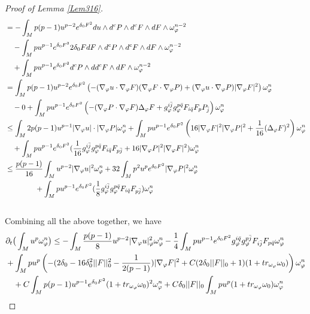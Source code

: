 \documentclass[11pt]{amsart}
\numberwithin{equation}{section}
\begin{document}
\begin{proof}[Proof of Lemma \ref{Lem316}]
\begin{align}
	&=-\int_Mp(p-1)u^{p-2}e^{\delta_0F^2}du\wedge d^cP\wedge d^cF\wedge dF\wedge \omega_{\varphi}^{n-2} \notag \\
	&\quad-\int_Mpu^{p-1}e^{\delta_0F^2}2\delta_0 F dF\wedge d^cP\wedge d^cF\wedge dF\wedge \omega_{\varphi}^{n-2} \notag \\
	&\quad +\int_M pu^{p-1}e^{\delta_0F^2}d^cP\wedge dd^cF\wedge dF\wedge \omega_{\varphi}^{n-2} \notag\\
	&= \int_Mp(p-1)u^{p-2}e^{\delta_0F^2}\left( -(\nabla_\varphi u\cdot\nabla_\varphi F)(\nabla_\varphi F\cdot\nabla_\varphi P) + (\nabla_\varphi u\cdot \nabla_\varphi P) |\nabla_\varphi F|^2 \right)  \omega_{\varphi}^{n} \notag \\
	&\quad -0+\int_M pu^{p-1}e^{\delta_0F^2}\left(-(\nabla_\varphi P\cdot \nabla_\varphi F)\Delta_\varphi F+ g_\varphi^{i\bar j}g_\varphi^{p\bar q}F_{i\bar q}F_{p}P_{\bar j} \right)  \omega_{\varphi}^{n} \notag\\
	&\le  \int_M 2p(p-1)u^{p-1}|\nabla_\varphi u|\cdot|\nabla_\varphi P| \omega_\varphi^n + \int_M pu^{p-1}e^{\delta_0F^2}\left( 16|\nabla_\varphi F|^2|\nabla_\varphi P|^2 +\frac{1}{16} (\Delta_\varphi F)^2\right) \omega_\varphi^n \notag\\
	&\quad + \int_M pu^{p-1}e^{\delta_0F^2}(\frac{1}{16}g_\varphi^{i\bar j}g_\varphi^{p\bar q}F_{i\bar q}F_{p\bar j}+16 |\nabla_\varphi P|^2|\nabla_\varphi F|^2)\omega_\varphi^n \notag\\
	&\le  \frac{p(p-1)}{16}\int_Mu^{p-2}|\nabla_{\varphi}u|^2\omega_{\varphi}^n  + 32\int_M p^2u^pe^{\delta_0F^2} |\nabla_\varphi P|^2 \omega_\varphi^n \notag\\
	&\qquad\qquad  + \int_M pu^{p-1}e^{\delta_0F^2}(\frac{1}{8}g_\varphi^{i\bar j}g_\varphi^{p\bar q}F_{i\bar q}F_{p\bar j})\omega_\varphi^n
\end{align}\\
Combining all the above together, we have 
\begin{align}
	&\partial_t\big( \int_M u^p\omega_\varphi^n\big)\le  - \int_M \frac{p(p-1)}{8} u^{p-2} |\nabla_\varphi u|^2_\varphi\omega_\varphi^n - \frac{1}{4}\int_M pu^{p-1}e^{\delta_0 F^2} g_{\varphi}^{i\bar{q}}g_{\varphi}^{p\bar{j}}F_{i\bar{j}}F_{p\bar{q}}\omega_\varphi^n \notag\\
	 & +\int_M pu^{p}\left( -(2\delta_0-16\delta_0^2 ||F||_0^2-\frac{1}{2(p-1)})|\nabla_\varphi F|^2 +C(2\delta_0 ||F||_0 +1)(1+tr_{\omega_{\varphi}}\omega_0)\right)\omega_\varphi^n \notag\\
	 & \quad +C\int_M p(p-1)u^{p-1}e^{\delta_0 F^2}(1+tr_{\omega_{\varphi}}\omega_0)^2\omega_{\varphi}^n +C\delta_0||F||_0 \int_M pu^p  (1+tr_{\omega_{\varphi}}\omega_0)\omega_\varphi^n \notag\\

\end{align}
\end{proof}
\end{document}
